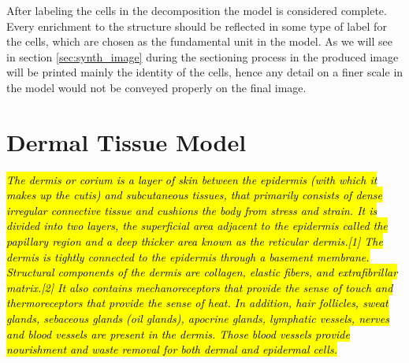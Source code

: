 After labeling the cells in the decomposition the model is considered complete. Every enrichment to the structure should be reflected in some type of label for the cells, which are chosen as the fundamental unit in the model. As we will see in section \ref{sec:synth_image} during the sectioning process in the produced image will be printed mainly the identity of the cells, hence any detail on a finer scale in the model would not be conveyed properly on the final image.

\section{Dermal Tissue Model} \label{ssec:derm_tis_mod}
\hl{\textit{The dermis or corium is a layer of skin between the epidermis (with which it makes up the cutis) and subcutaneous tissues, that primarily consists of dense irregular connective tissue and cushions the body from stress and strain. It is divided into two layers, the superficial area adjacent to the epidermis called the papillary region and a deep thicker area known as the reticular dermis.[1] The dermis is tightly connected to the epidermis through a basement membrane. Structural components of the dermis are collagen, elastic fibers, and extrafibrillar matrix.[2] It also contains mechanoreceptors that provide the sense of touch and thermoreceptors that provide the sense of heat. In addition, hair follicles, sweat glands, sebaceous glands (oil glands), apocrine glands, lymphatic vessels, nerves and blood vessels are present in the dermis. Those blood vessels provide nourishment and waste removal for both dermal and epidermal cells.
}}

